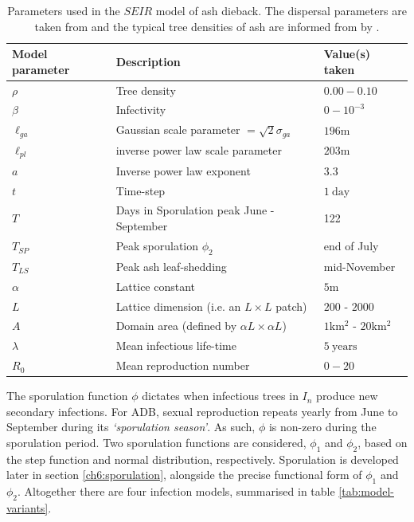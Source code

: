 \begin{table}[h]
\centering
\begin{tabular}{l l l}
\hline
\textbf{Model parameter} & \textbf{Description} & \textbf{Value(s) taken}\\
\hline
$\rho$  & Tree density & $0.00 - 0.10$ \\ 
$\beta$ & Infectivity & $0 - 10^{-3}$ \\
$\ell_{ga}$ & Gaussian scale parameter $=\sqrt{2}\sigma_{ga}$ & $196\mathrm{m}$ \\
$\ell_{pl}$ & inverse power law scale parameter & $203\mathrm{m}$ \\
$a$ & Inverse power law exponent & $3.3$ \\
$t$ & Time-step & $1\ \mathrm{day}$\\
$T$ & Days in Sporulation peak June - September & 122  \\
$T_{SP}$ & Peak sporulation $\phi_2$ & end of July \\
$T_{LS}$ & Peak ash leaf-shedding & mid-November \\
$\alpha$ & Lattice constant & $5\mathrm{m}$ \\
$L$ & Lattice dimension (i.e. an $L\times L$ patch)  & $200$ - $2000$ \\
$A$ & Domain area (defined by $\alpha L\times \alpha L$) & $1\mathrm{km^2}$ - $20\mathrm{km^2}$ \\
$\lambda$ & Mean infectious life-time & $5\ \mathrm{years}$ \\
$R_0$ & Mean reproduction number & $0-20$ \\
\hline
\end{tabular}
\caption{Parameters used in the $SEIR$ model of ash dieback. The dispersal parameters are taken from \cite{grosdidier2018tracking} and the typical tree densities of ash are informed from by \cite{hill.data}.}
\label{tab:SEIR-model}
\end{table}

The sporulation function $\phi$ dictates when infectious trees in $I_n$ produce new secondary infections. 
For ADB, sexual reproduction repeats yearly from June to September during its \textit{`sporulation season'}.
As such, $\phi$ is non-zero during the sporulation period.
Two sporulation functions are considered, $\phi_1$ and $\phi_2$, based on the step function and normal distribution, respectively.
Sporulation is developed later in section \ref{ch6:sporulation}, alongside the precise functional form of $\phi_1$ and $\phi_2$.
Altogether there are four infection models, summarised in table \ref{tab:model-variants}.


